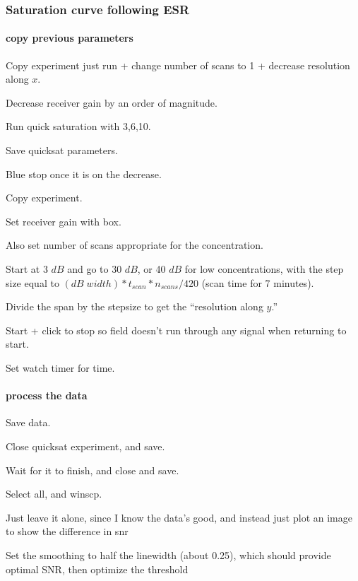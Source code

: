 \subsubsection{Saturation curve following ESR}
\paragraph{copy previous parameters}
Copy experiment just run + change number of scans to 1 + decrease resolution along $x$.

Decrease receiver gain by an order of magnitude.

Run quick saturation with 3,6,10.

Save quicksat parameters.

Blue stop once it is on the decrease.

Copy experiment.

Set receiver gain with box.

Also set number of scans appropriate for the concentration.

Start at 3 $dB$ and go to 30 $dB$, or 40 $dB$ for low concentrations, with the step size equal to $(dB\;width)*t_{scan}*n_{scans}/420$ (scan time for 7 minutes).

Divide the span by the stepsize to get the ``resolution along $y$.''

Start + click to stop so field doesn't run through any signal when returning to start.

Set watch timer for time.

\paragraph{process the data}
Save data.

Close quicksat experiment, and save.

Wait for it to finish, and close and save.

Select all, and winscp.

Just leave it alone, since I know the data's good, and instead just plot an image to show the difference in snr

Set the smoothing to half the linewidth (about 0.25), which should provide optimal SNR, then optimize the threshold


